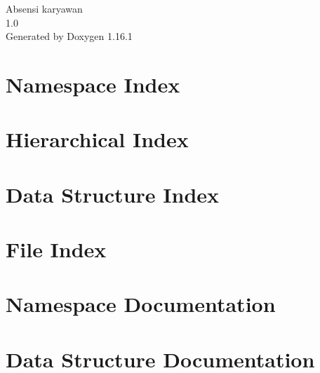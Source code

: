 \documentclass[twoside]{book}
\newcommand{\+}{\discretionary{\mbox{\scriptsize$\hookleftarrow$}}{}{}}
\newcommand{\clearemptydoublepage}{%
    \newpage{\pagestyle{empty}\cleardoublepage}%
  }
\begin{document}
  \raggedbottom
    \hypersetup{pageanchor=false,
                bookmarksnumbered=true,
                pdfencoding=unicode
               }
  \begin{titlepage}
  \vspace*{7cm}
  \begin{center}%
  {\Large Absensi karyawan}\\
  [1ex]\large 1.\+0 \\
  \vspace*{1cm}
  {\large Generated by Doxygen 1.16.1}\\
  \end{center}
  \end{titlepage}
  \clearemptydoublepage
  \tableofcontents
  \clearemptydoublepage
  \hypersetup{pageanchor=true}
\chapter{Namespace Index}

\chapter{Hierarchical Index}

\chapter{Data Structure Index}

\chapter{File Index}

\chapter{Namespace Documentation}

\chapter{Data Structure Documentation}








\end{document}
